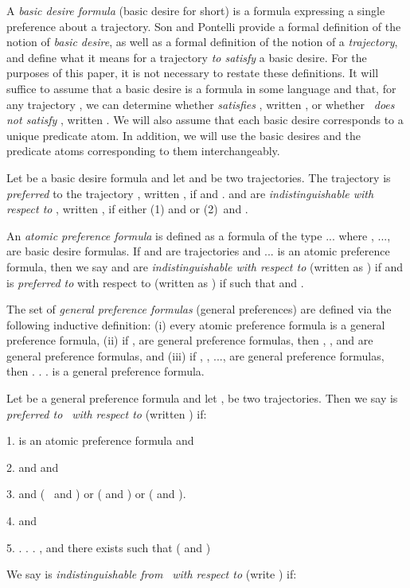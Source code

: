 \documentclass[letterpaper]{article}\usepackage{aaai}
\begin{document}
A \emph{basic desire formula} (basic desire for short) is a formula expressing
a single preference about a trajectory. Son and Pontelli provide a formal
definition of the notion of \emph{basic desire}, as well as a formal
definition of the notion of a \emph{trajectory}, and define what it means for
a trajectory \emph{to satisfy} a basic desire. For the purposes of this paper,
it is not necessary to restate these definitions. It will suffice to assume
that a basic desire is a formula  in some language and that, for any
trajectory , we can determine whether  \emph{satisfies} , written , or whether \emph{\ does not satisfy
}, written . We will also assume that each
basic desire corresponds to a unique predicate atom. In addition, we will use
the basic desires and the predicate atoms corresponding to them interchangeably.

Let  be a basic desire formula and let  and  be two
trajectories. The trajectory  is \emph{preferred} to the trajectory
, written , if  and
.  and  are \emph{indistinguishable
with respect to }, written , if either
(1) and  or (2)\  and .

An \emph{atomic preference formula} is defined as a formula of the type
... where , ..., 
are basic desire formulas. If  and  are trajectories and
... is an atomic preference
formula, then we say  and  are \emph{indistinguishable with
respect to } (written as ) if 
   and 
is \emph{preferred to } with respect to  (written as ) if  such that
  and
.

The set of \emph{general preference formulas} (general preferences) are
defined via the following inductive definition: (i) every atomic preference
formula  is a general preference formula, (ii) if ,  are general preference formulas, then , , and  are general preference formulas, and (iii) if
, , ...,  are general preference formulas, then
 . . .  is a general preference formula.

Let  be a general preference formula and let ,  be two
trajectories. Then we say  is \emph{preferred to }\emph{\ with
respect to } (written ) if:

1.  is an atomic preference formula and 

2.  and  and


3.  and ( \ and
) or ( and
) or ( and
).

4.  and 

5.  . . . , and there exists
 such that (  and ) \newline

We say  is \emph{indistinguishable from }\emph{\ with respect
to } (write ) if:
\end{document}
